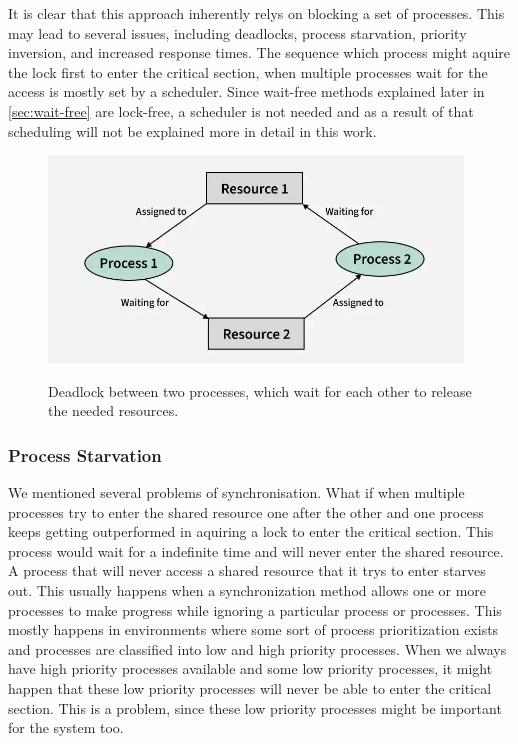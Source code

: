 It is clear that this approach inherently relys on blocking a set of processes. This may lead to several issues, including deadlocks, process starvation, priority inversion, and increased response times. The sequence which process might aquire the lock first to enter the critical section, when multiple processes wait for the access is mostly set by a scheduler. Since wait-free methods explained later in \cref{sec:wait-free} are lock-free, a scheduler is not needed and as a result of that scheduling will not be explained more in detail in this work. \cite{brandenburg2019multiprocessorrealtimelockingprotocols,MutexSemaphoreIPC}

\begin{figure}[!ht]
    \centering
    \captionsetup{justification=centering}
    \caption{Deadlock between two processes, which wait for each other to release the needed resources.}
    \includegraphics[width=110mm]{images/deadlock.png}
    \cite{Deadlock}
    \label{fig:deadlock}
\end{figure}

\subsubsection{Process Starvation}\label{subsubsec:process-starvation}

We mentioned several problems of synchronisation. What if when multiple processes try to enter the shared resource one after the other and one process keeps getting outperformed in aquiring a lock to enter the critical section. This process would wait for a indefinite time and will never enter the shared resource. A process that will never access a shared resource that it trys to enter starves out. This usually happens when a synchronization method allows one or more processes to make progress while ignoring a particular process or processes. This mostly happens in environments where some sort of process prioritization exists and processes are classified into low and high priority processes. When we always have high priority processes available and some low priority processes, it might happen that these low priority processes will never be able to enter the critical section. This is a problem, since these low priority processes might be important for the system too. \cite{Starvation}

